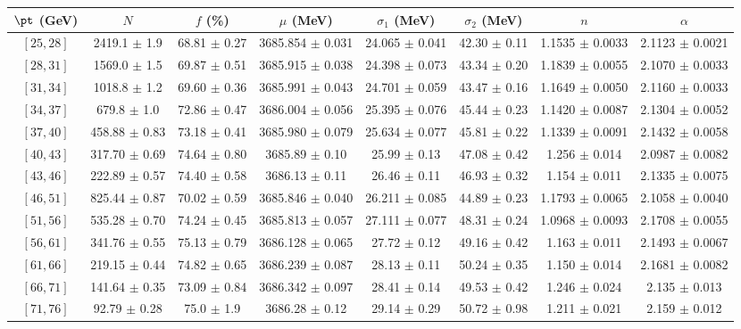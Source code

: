 \begin{tabular}{c||c|c|c|c|c|c|c}
$\pt$ (GeV) & $N$ & $f$ (\%) & $\mu$ (MeV) & $\sigma_1$ (MeV) & $\sigma_2$ (MeV) & $n$ & $\alpha$ \\
\hline
$[25, 28]$ & 2419.1 $\pm$ 1.9 & 68.81 $\pm$ 0.27 & 3685.854 $\pm$ 0.031 & 24.065 $\pm$ 0.041 & 42.30 $\pm$ 0.11 & 1.1535 $\pm$ 0.0033 & 2.1123 $\pm$ 0.0021\\
$[28, 31]$ & 1569.0 $\pm$ 1.5 & 69.87 $\pm$ 0.51 & 3685.915 $\pm$ 0.038 & 24.398 $\pm$ 0.073 & 43.34 $\pm$ 0.20 & 1.1839 $\pm$ 0.0055 & 2.1070 $\pm$ 0.0033\\
$[31, 34]$ & 1018.8 $\pm$ 1.2 & 69.60 $\pm$ 0.36 & 3685.991 $\pm$ 0.043 & 24.701 $\pm$ 0.059 & 43.47 $\pm$ 0.16 & 1.1649 $\pm$ 0.0050 & 2.1160 $\pm$ 0.0033\\
$[34, 37]$ & 679.8 $\pm$ 1.0 & 72.86 $\pm$ 0.47 & 3686.004 $\pm$ 0.056 & 25.395 $\pm$ 0.076 & 45.44 $\pm$ 0.23 & 1.1420 $\pm$ 0.0087 & 2.1304 $\pm$ 0.0052\\
$[37, 40]$ & 458.88 $\pm$ 0.83 & 73.18 $\pm$ 0.41 & 3685.980 $\pm$ 0.079 & 25.634 $\pm$ 0.077 & 45.81 $\pm$ 0.22 & 1.1339 $\pm$ 0.0091 & 2.1432 $\pm$ 0.0058\\
$[40, 43]$ & 317.70 $\pm$ 0.69 & 74.64 $\pm$ 0.80 & 3685.89 $\pm$ 0.10 & 25.99 $\pm$ 0.13 & 47.08 $\pm$ 0.42 & 1.256 $\pm$ 0.014 & 2.0987 $\pm$ 0.0082\\
$[43, 46]$ & 222.89 $\pm$ 0.57 & 74.40 $\pm$ 0.58 & 3686.13 $\pm$ 0.11 & 26.46 $\pm$ 0.11 & 46.93 $\pm$ 0.32 & 1.154 $\pm$ 0.011 & 2.1335 $\pm$ 0.0075\\
$[46, 51]$ & 825.44 $\pm$ 0.87 & 70.02 $\pm$ 0.59 & 3685.846 $\pm$ 0.040 & 26.211 $\pm$ 0.085 & 44.89 $\pm$ 0.23 & 1.1793 $\pm$ 0.0065 & 2.1058 $\pm$ 0.0040\\
$[51, 56]$ & 535.28 $\pm$ 0.70 & 74.24 $\pm$ 0.45 & 3685.813 $\pm$ 0.057 & 27.111 $\pm$ 0.077 & 48.31 $\pm$ 0.24 & 1.0968 $\pm$ 0.0093 & 2.1708 $\pm$ 0.0055\\
$[56, 61]$ & 341.76 $\pm$ 0.55 & 75.13 $\pm$ 0.79 & 3686.128 $\pm$ 0.065 & 27.72 $\pm$ 0.12 & 49.16 $\pm$ 0.42 & 1.163 $\pm$ 0.011 & 2.1493 $\pm$ 0.0067\\
$[61, 66]$ & 219.15 $\pm$ 0.44 & 74.82 $\pm$ 0.65 & 3686.239 $\pm$ 0.087 & 28.13 $\pm$ 0.11 & 50.24 $\pm$ 0.35 & 1.150 $\pm$ 0.014 & 2.1681 $\pm$ 0.0082\\
$[66, 71]$ & 141.64 $\pm$ 0.35 & 73.09 $\pm$ 0.84 & 3686.342 $\pm$ 0.097 & 28.41 $\pm$ 0.14 & 49.53 $\pm$ 0.42 & 1.246 $\pm$ 0.024 & 2.135 $\pm$ 0.013\\
$[71, 76]$ & 92.79 $\pm$ 0.28 & 75.0 $\pm$ 1.9 & 3686.28 $\pm$ 0.12 & 29.14 $\pm$ 0.29 & 50.72 $\pm$ 0.98 & 1.211 $\pm$ 0.021 & 2.159 $\pm$ 0.012\\

\end{tabular}
